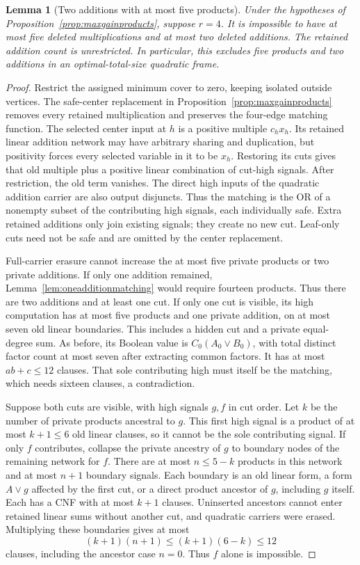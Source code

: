 \documentclass[11pt]{article}
\newtheorem{lemma}[theorem]{Lemma}
\theoremstyle{definition}
\theoremstyle{remark}
\begin{document}
\begin{lemma}[Two additions with at most five products]\label{lem:fiveproductsseven}
Under the hypotheses of Proposition~\ref{prop:maxgainproducts}, suppose $r=4$. It is impossible to have at most five deleted multiplications and at most two deleted additions. The retained addition count is unrestricted. In particular, this excludes five products and two additions in an optimal-total-size quadratic frame.
\end{lemma}
\begin{proof}
Restrict the assigned minimum cover to zero, keeping isolated outside vertices. The safe-center replacement in Proposition~\ref{prop:maxgainproducts} removes every retained multiplication and preserves the four-edge matching function. The selected center input at $h$ is a positive multiple $c_hx_h$. Its retained linear addition network may have arbitrary sharing and duplication, but positivity forces every selected variable in it to be $x_h$. Restoring its cuts gives that old multiple plus a positive linear combination of cut-high signals. After restriction, the old term vanishes. The direct high inputs of the quadratic addition carrier are also output disjuncts. Thus the matching is the OR of a nonempty subset of the contributing high signals, each individually safe. Extra retained additions only join existing signals; they create no new cut. Leaf-only cuts need not be safe and are omitted by the center replacement.

Full-carrier erasure cannot increase the at most five private products or two private additions. If only one addition remained, Lemma~\ref{lem:oneadditionmatching} would require fourteen products. Thus there are two additions and at least one cut. If only one cut is visible, its high computation has at most five products and one private addition, on at most seven old linear boundaries. This includes a hidden cut and a private equal-degree sum. As before, its Boolean value is $C_0(A_0\vee B_0)$, with total distinct factor count at most seven after extracting common factors. It has at most $ab+c\le12$ clauses. That sole contributing high must itself be the matching, which needs sixteen clauses, a contradiction.

Suppose both cuts are visible, with high signals $g,f$ in cut order. Let $k$ be the number of private products ancestral to $g$. This first high signal is a product of at most $k+1\le6$ old linear clauses, so it cannot be the sole contributing signal. If only $f$ contributes, collapse the private ancestry of $g$ to boundary nodes of the remaining network for $f$. There are at most $n\le5-k$ products in this network and at most $n+1$ boundary signals. Each boundary is an old linear form, a form $A\vee g$ affected by the first cut, or a direct product ancestor of $g$, including $g$ itself. Each has a CNF with at most $k+1$ clauses. Uninserted ancestors cannot enter retained linear sums without another cut, and quadratic carriers were erased. Multiplying these boundaries gives at most
\[
 (k+1)(n+1)\le(k+1)(6-k)\le12
\]
clauses, including the ancestor case $n=0$. Thus $f$ alone is impossible.


\end{proof}
\end{document}
